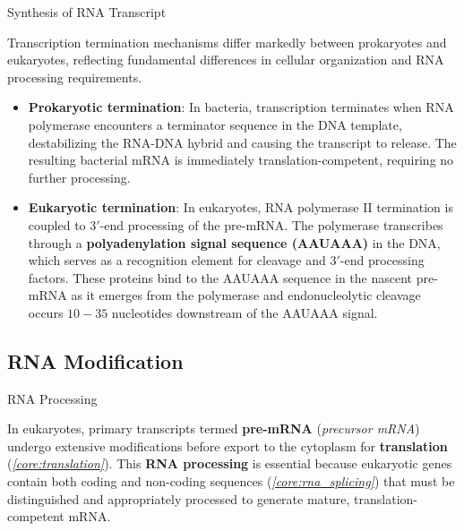 \documentclass[10pt]{article}
\begin{document}
\begin{core}[label=core:transcription]{Synthesis of RNA Transcript}
\begin{enumerate}
        
        Transcription termination mechanisms differ markedly between prokaryotes and eukaryotes, reflecting fundamental differences in cellular organization and RNA processing requirements.

        \begin{itemize}

          \item \textbf{Prokaryotic termination}: In bacteria, transcription terminates when RNA polymerase encounters a terminator sequence in the DNA template, destabilizing the RNA-DNA hybrid and causing the transcript to release. The resulting bacterial mRNA is immediately translation-competent, requiring no further processing.

          \item \textbf{Eukaryotic termination}: In eukaryotes, RNA polymerase II termination is coupled to $3'$-end processing of the pre-mRNA. The polymerase transcribes through a \textbf{polyadenylation signal sequence (AAUAAA)} in the DNA, which serves as a recognition element for cleavage and $3'$-end processing factors. These proteins bind to the AAUAAA sequence in the nascent pre-mRNA as it emerges from the polymerase and endonucleolytic cleavage occurs $10-35$ nucleotides downstream of the AAUAAA signal.

        \end{itemize}

      \end{enumerate}
        
    \end{core}

  \subsection{RNA Modification}

    \begin{core}{RNA Processing}

      In eukaryotes, primary transcripts termed \textbf{pre-mRNA} (\textit{precursor mRNA}) undergo extensive modifications before export to the cytoplasm for \textbf{translation} (\textit{\autoref{core:translation}}). This \textbf{RNA processing} is essential because eukaryotic genes contain both coding and non-coding sequences (\textit{\autoref{core:rna_splicing}}) that must be distinguished and appropriately processed to generate mature, translation-competent mRNA. 

    \end{core}
    
\end{document}
